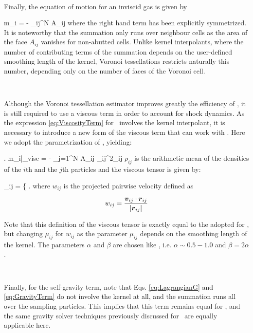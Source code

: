 \documentclass[a4,useAMS,usenatbib,usegraphicx,12pt]{article}
\begin{document}
\

Finally, the equation of motion for an inviscid gas is given by

{ m_i  = - \sum_{i\neq j}^N A_{ij} }
where the right hand term has been explicitly symmetrized. It is noteworthy that
the summation only runs over neighbour cells as the area of the face $A_{ij}$ 
vanishes for non-abutted cells. Unlike kernel interpolants, where the number of
contributing terms of the summation depends on the user-defined smoothing 
length of the kernel, Voronoi tessellations restricts naturally this number, 
depending only on the number of faces of the Voronoi cell.

\

Although the Voronoi tessellation estimator improves greatly the efficiency of 
\SPH, it is still required to use a viscous term in order to account for shock
dynamics. As the expression \ref{eq:ViscosityTerm} for \SPH\ involves the kernel
interpolant, it is necessary to introduce a new form of the viscous term that 
can work with \VPH. Here we adopt the parametrization of \citet{Hess10}, 
yielding:

{ \left. m_i\right|_{\mbox{\footnotesize visc}} =
- \sum_{j=1}^N A_{ij} {\rho}_{ij}^2\Pi_{ij} }
$\rho_{ij}$ is the arithmetic mean of the densities of the $i$th and the $j$th 
particles and the viscous tensor is given by:

{ \Pi_{ij} = \left\{ \right. }
where $w_{ij}$ is the projected pairwise velocity defined as

\[ w_{ij} = \frac{ \boldsymbol{ v }_{ij}\cdot \boldsymbol{ r }_{ij} }{|\boldsymbol{ r }_{ij}|} \]

Note that this definition of the viscous tensor is exactly equal to the adopted 
for \SPH, but changing $\mu_{ij}$ for $w_{ij}$ as the parameter $\mu_{ij}$ 
depends on the smoothing length of the kernel. The parameters $\alpha$ and 
$\beta$ are chosen like \SPH, i.e. $\alpha \sim 0.5-1.0$ and $\beta = 2\alpha$.

\

Finally, for the self-gravity term, note that Eqs. \ref{eq:LagrangianG} and 
\ref{eq:GravityTerm} do not involve the kernel at all, and the summation runs
all over the sampling particles. This implies that this term remains equal for 
\VPH, and the same gravity solver techniques previously discussed for \SPH\ are
equally applicable here.
\end{document}
